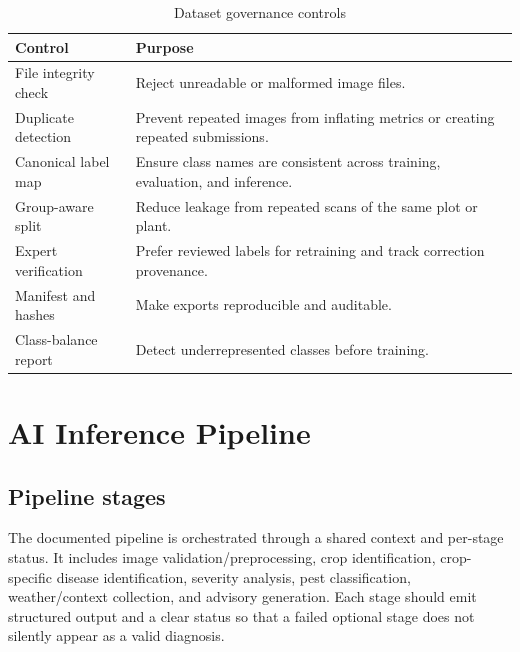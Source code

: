 \documentclass[12pt,a4paper,oneside,openany]{report}
\begin{document}
\begin{table}[htbp]
\centering
\caption{Dataset governance controls}
\begin{tabularx}{\textwidth}{P{3.6cm}Y}
\toprule
\textbf{Control} & \textbf{Purpose}\\
\midrule
File integrity check & Reject unreadable or malformed image files.\\
Duplicate detection & Prevent repeated images from inflating metrics or creating repeated submissions.\\
Canonical label map & Ensure class names are consistent across training, evaluation, and inference.\\
Group-aware split & Reduce leakage from repeated scans of the same plot or plant.\\
Expert verification & Prefer reviewed labels for retraining and track correction provenance.\\
Manifest and hashes & Make exports reproducible and auditable.\\
Class-balance report & Detect underrepresented classes before training.\\
\bottomrule
\end{tabularx}
\end{table}

\chapter{AI Inference Pipeline}
\section{Pipeline stages}
The documented pipeline is orchestrated through a shared context and per-stage status. It includes image validation/preprocessing, crop identification, crop-specific disease identification, severity analysis, pest classification, weather/context collection, and advisory generation. Each stage should emit structured output and a clear status so that a failed optional stage does not silently appear as a valid diagnosis.
\end{document}
